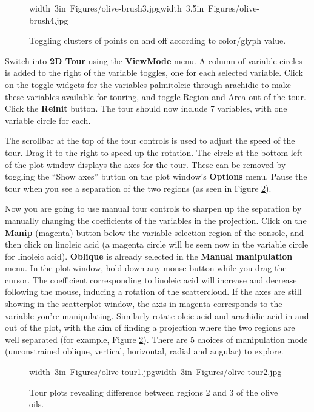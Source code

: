 \documentclass[11pt]{article}
\begin{document}
\begin{figure}[htp]
\hbox{\pdfimage width 3in {Figures/olive-brush3.jpg}\pdfimage width 3.5in {Figures/olive-brush4.jpg}}
\caption{Toggling clusters of points on and off according to color/glyph value.}
\label{fig5}
\end{figure}

Switch into {\bf 2D Tour} using the {\bf ViewMode} menu. A column of
variable circles is added to the right of the variable toggles, one for
each selected variable.  Click on the toggle widgets for the variables
palmitoleic through arachidic to make these variables available for
touring, and toggle Region and Area out of the tour.  Click the {\bf
Reinit} button.  The tour should now include 7 variables, with one variable
circle for each.

The scrollbar at the top of the tour controls is used to adjust the
speed of the tour.  Drag it to the right to speed up the rotation.
The circle at the bottom left of the plot window displays the axes
for the tour. These can be removed by toggling the ``Show axes''
button on the plot window's {\bf Options} menu.  Pause the tour when
you see a separation of the two regions (as seen in Figure
\ref{fig6}).

Now you are going to use manual tour controls to sharpen up the
separation by manually changing the coefficients of the variables in
the projection.  Click on the {\bf Manip} (magenta) button below the
variable selection region of the console, and then click on linoleic
acid (a magenta circle will be seen now in the variable circle for
linoleic acid).  {\bf Oblique} is already selected in the {\bf Manual
manipulation} menu.  In the plot window, hold down any mouse
button while you drag the cursor. The coefficient corresponding to
linoleic acid will increase and decrease following the mouse, inducing
a rotation of the scattercloud.  If the axes are still showing in the
scatterplot window, the axis in magenta corresponds to the variable
you're manipulating.  Similarly rotate oleic acid and arachidic acid
in and out of the plot, with the aim of finding a projection where the
two regions are well separated (for example, Figure \ref{fig6}).
There are 5 choices of manipulation mode (unconstrained oblique,
vertical, horizontal, radial and angular) to explore.

\begin{figure}[htp]
\hbox{\pdfimage width 3in {Figures/olive-tour1.jpg}\pdfimage width 3in {Figures/olive-tour2.jpg}}
\caption{Tour plots revealing difference between regions 2 and 3 of the
olive oils.}
\label{fig6}
\end{figure}
\end{document}
